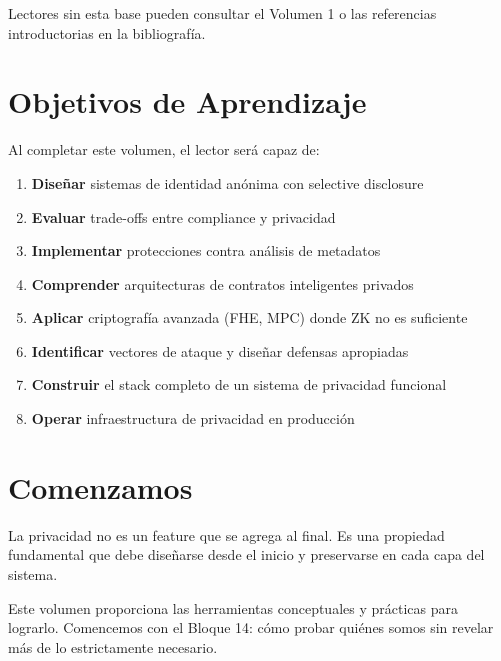 \documentclass[11pt,a4paper,twoside]{book}
\theoremstyle{definition}
\theoremstyle{remark}
\renewcommand{\cleardoublepage}{\clearpage}
\begin{document}
Lectores sin esta base pueden consultar el Volumen 1 o las referencias introductorias en la bibliografía.

\section*{Objetivos de Aprendizaje}

Al completar este volumen, el lector será capaz de:

\begin{enumerate}
    \item \textbf{Diseñar} sistemas de identidad anónima con selective disclosure
    \item \textbf{Evaluar} trade-offs entre compliance y privacidad
    \item \textbf{Implementar} protecciones contra análisis de metadatos
    \item \textbf{Comprender} arquitecturas de contratos inteligentes privados
    \item \textbf{Aplicar} criptografía avanzada (FHE, MPC) donde ZK no es suficiente
    \item \textbf{Identificar} vectores de ataque y diseñar defensas apropiadas
    \item \textbf{Construir} el stack completo de un sistema de privacidad funcional
    \item \textbf{Operar} infraestructura de privacidad en producción
\end{enumerate}

\section*{Comenzamos}

La privacidad no es un feature que se agrega al final. Es una propiedad fundamental que debe diseñarse desde el inicio y preservarse en cada capa del sistema. 

Este volumen proporciona las herramientas conceptuales y prácticas para lograrlo. Comencemos con el Bloque 14: cómo probar quiénes somos sin revelar más de lo estrictamente necesario.

\cleardoublepage

\tableofcontents
\cleardoublepage
\end{document}
